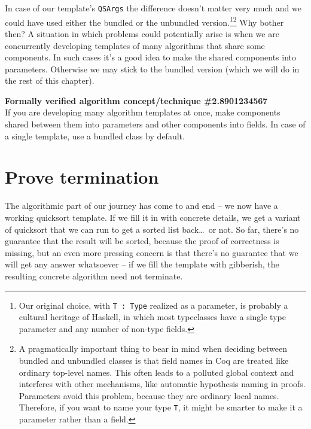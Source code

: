 \documentclass[declaration,mgr,english,shortabstract]{iithesis}
\newcommand{\m}[1]{\texttt{#1}}
\begin{document}
In case of our template's \m{QSArgs} the difference doesn't matter very much and we could have used either the bundled or the unbundled version.\footnote{Our original choice, with \m{T\ :\ Type} realized as a parameter, is probably a cultural heritage of Haskell, in which most typeclasses have a single type parameter and any number of non-type fields.}\footnote{A pragmatically important thing to bear in mind when deciding between bundled and unbundled classes is that field names in Coq are treated like ordinary top-level names. This often leads to a polluted global context and interferes with other mechanisms, like automatic hypothesis naming in proofs. Parameters avoid this problem, because they are ordinary local names. Therefore, if you want to name your type \m{T}, it might be smarter to make it a parameter rather than a field.} Why bother then? A situation in which problems could potentially arise is when we are concurrently developing templates of many algorithms that share some components. In such cases it's a good idea to make the shared components into parameters. Otherwise we may stick to the bundled version (which we will do in the rest of this chapter).

\begin{center}
    \textbf{Formally verified algorithm concept/technique \#2.8901234567} \\
    If you are developing many algorithm templates at once, make components shared between them into parameters and other components into fields. In case of a single template, use a bundled class by default.
\end{center}


\chapter{Prove termination} \label{termination}

The algorithmic part of our journey has come to and end -- we now have a working quicksort template. If we fill it in with concrete details, we get a variant of quicksort that we can run to get a sorted list back\dots\ or not. So far, there's no guarantee that the result will be sorted, because the proof of correctness is missing, but an even more pressing concern is that there's no guarantee that we will get any answer whatsoever -- if we fill the template with gibberish, the resulting concrete algorithm need not terminate.
\end{document}
